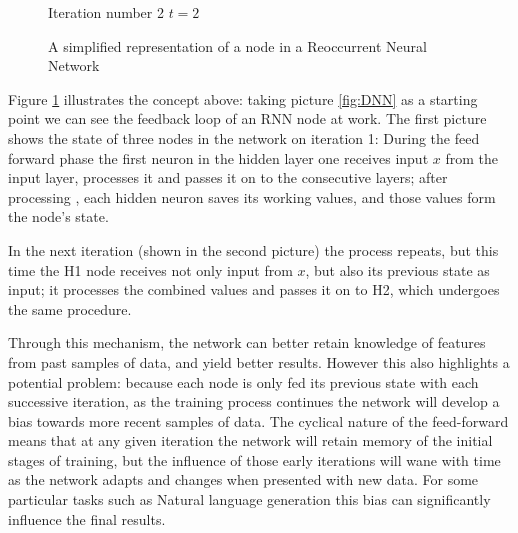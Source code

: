\begin{figure}[H]
\centering    
{}
\begin{center}
Iteration number 2 $t=2$
\end{center}
    \caption{A simplified representation of a node in a Reoccurrent Neural Network}\label{fig:rnn_neuron}
    
\end{figure}
\clearpage
Figure \ref{fig:rnn_neuron} illustrates the concept above: taking picture \ref{fig:DNN} as a starting point we can see the feedback loop of an RNN node at work.
The first picture shows the state of three nodes in the network on iteration 1: During the feed forward phase the first neuron in the hidden layer one receives input $x$ from the input layer, processes it and passes it on to the consecutive layers; after processing , each hidden neuron saves its working values, and those values form the node's state.  

In the next iteration (shown in the second picture) the process repeats, but this time the  H1 node receives not only input from $x$, but also its previous state as input; it processes the combined values and passes it on to H2, which undergoes the same procedure.

Through this mechanism, the network can better retain knowledge of features from past samples of data, and yield better results.
However this also highlights a potential problem: because each node is only fed its previous state with each successive iteration, as the training process continues the network will develop a bias towards more recent samples of data.
 The cyclical nature of the feed-forward means that at any given iteration the network will retain memory of the initial stages of training, but the influence of those early iterations will wane with time as the network adapts and changes when presented with new data.
For some particular tasks such as Natural language generation this bias can significantly influence the final results.

